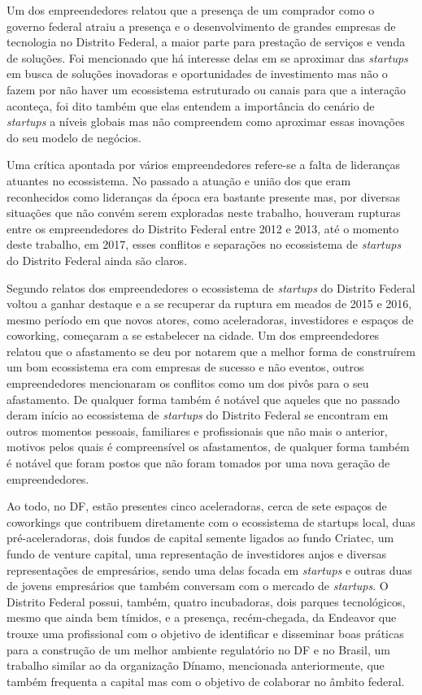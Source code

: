 Um dos empreendedores relatou que a presença de um comprador como o governo federal atraiu a presença e o desenvolvimento de grandes empresas de tecnologia no Distrito Federal, a maior parte para prestação de serviços e venda de soluções. Foi mencionado que há interesse delas em se aproximar das \textit{startups} em busca de soluções inovadoras e oportunidades de investimento mas não o fazem por não haver um ecossistema estruturado ou canais para que a interação aconteça, foi dito também que elas entendem a importância do cenário de \textit{startups} a níveis globais mas não compreendem como aproximar essas inovações do seu modelo de negócios. 

Uma crítica apontada por vários empreendedores refere-se a falta de lideranças atuantes no ecossistema. No passado a atuação e união dos que eram reconhecidos como lideranças da época era bastante presente mas, por diversas situações que não convém serem exploradas neste trabalho, houveram rupturas entre os empreendedores do Distrito Federal entre 2012 e 2013, até o momento deste trabalho, em 2017, esses conflitos e separações no ecossistema de \textit{startups} do Distrito Federal ainda são claros. 

Segundo relatos dos empreendedores o ecossistema de \textit{startups} do Distrito Federal voltou a ganhar destaque e a se recuperar da ruptura em meados de 2015 e 2016, mesmo período em que novos atores, como aceleradoras, investidores e espaços de coworking, começaram a se estabelecer na cidade. Um dos empreendedores relatou que o afastamento se deu por notarem que a melhor forma de construírem um bom ecossistema era com empresas de sucesso e não eventos, outros empreendedores mencionaram os conflitos como um dos pivôs para o seu afastamento. De qualquer forma também é notável que aqueles que no passado deram início ao ecossistema de \textit{startups} do Distrito Federal se encontram em outros momentos pessoais, familiares e profissionais que não mais o anterior, motivos pelos quais é compreensível os afastamentos, de qualquer forma também é notável que foram postos que não foram tomados por uma nova geração de empreendedores.

Ao todo, no DF, estão presentes cinco aceleradoras, cerca de sete espaços de coworkings que contribuem diretamente com o ecossistema de startups local, duas pré-aceleradoras, dois fundos de capital semente ligados ao fundo Criatec, um fundo de venture capital, uma representação de investidores anjos e diversas representações de empresários, sendo uma delas focada em \textit{startups} e outras duas de jovens empresários que também conversam com o mercado de \textit{startups}. O Distrito Federal possui, também, quatro incubadoras, dois parques tecnológicos, mesmo que ainda bem tímidos, e a presença, recém-chegada, da Endeavor que trouxe uma profissional com o objetivo de identificar e disseminar boas práticas para a construção de um melhor ambiente regulatório no DF e no Brasil, um trabalho similar ao da organização Dínamo, mencionada anteriormente, que também frequenta a capital mas com o objetivo de colaborar no âmbito federal.

